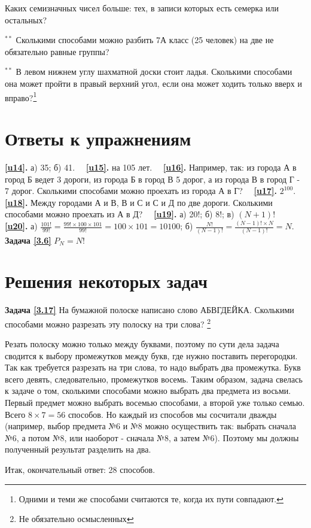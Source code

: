 \begin{thm}
	Каких семизначных чисел больше: тех, в записи которых есть семерка или остальных?
\end{thm}

\begin{thm}$^{\ast\ast}$
	Сколькими способами можно разбить 7А класс (25 человек) на две не обязательно равные группы?
\end{thm}

\begin{thm}$^{\ast\ast}$
	В левом нижнем углу шахматной доски стоит ладья. Сколькими способами она может пройти в правый верхний угол, если она может ходить только вверх и вправо?\footnote{Одними и теми же способами считаются те, когда их пути совпадают.}
\end{thm}
\newpage 

\section{Ответы к упражнениям}
\textbf{\ref{u14}.}	а) 35; б) 41.~~ \textbf{\ref{u15}.} на 105 лет.~~ \textbf{\ref{u16}.} Например, так: из города А в город Б ведет 3 дороги, из города Б в город В 5 дорог, а из города В в город Г - 7 дорог. Сколькими способами можно проехать из города А в Г?~~\textbf{ \ref{u17}.} $2^{100}$.~~ \textbf{\ref{u18}.} Между городами А и В, В и С и С и Д по две дороги. Сколькими способами можно проехать из А в Д?~~ \textbf{\ref{u19}.} а) 20!; б) 8!;  в) $(N+1)!$~~  \textbf{\ref{u20}.} а) $ \frac{101!}{99!}=\frac{99!\times 100\times 101}{99!} = 100\times 101 = 10100$; б) $\frac{N!}{(N-1)!} =\frac{(N-1)!\times N}{(N-1)!} = N$.~~ \textbf{Задача \ref{3.6}}  $P_N=N!$
\section{Решения некоторых задач}
\textbf{Задача \ref{3.17}}
	На бумажной полоске написано слово АБВГДЕЙКА. Сколькими способами можно разрезать эту полоску на три слова? \footnote{Не обязательно осмысленных}

\begin{prf}
	Резать полоску можно только между буквами, поэтому по сути дела задача сводится к выбору промежутков между букв, где нужно поставить перегородки. Так как требуется разрезать на три слова, то надо выбрать два промежутка. Букв всего девять, следовательно, промежутков восемь. Таким образом, задача свелась к задаче о том, сколькими способами можно выбрать два предмета из восьми. Первый предмет можно выбрать восемью способами, а второй уже только семью. Всего $8\times7=56$ способов. Но каждый из способов мы сосчитали дважды (например, выбор предмета №6 и №8 можно осуществить так: выбрать сначала №6, а потом №8, или наоборот - сначала №8, а затем №6). Поэтому мы должны полученный результат разделить на два. 
 
 Итак, окончательный ответ: 28 способов.
\end{prf}
